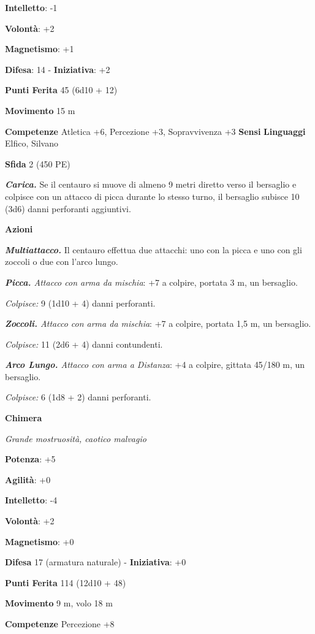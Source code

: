 \begin{multicols}{2}
\textbf{Intelletto}: -1

\textbf{Volontà}: +2

\textbf{Magnetismo}: +1

\textbf{Difesa}: 14 - \textbf{Iniziativa}: +2

\textbf{Punti Ferita} 45 (6d10 + 12)

\textbf{Movimento} 15 m

\textbf{Competenze} Atletica +6, Percezione +3, Sopravvivenza +3
\textbf{Sensi}  \textbf{Linguaggi} Elfico, Silvano

\textbf{Sfida} 2 (450 PE)

\emph{\textbf{Carica.}} Se il centauro si muove di almeno 9 metri
diretto verso il bersaglio e colpisce con un attacco di picca durante lo
stesso turno, il bersaglio subisce 10 (3d6) danni perforanti aggiuntivi.

\textbf{Azioni}

\emph{\textbf{Multiattacco.}} Il centauro effettua due attacchi: uno con
la picca e uno con gli zoccoli o due con l'arco lungo.

\emph{\textbf{Picca.} Attacco con arma da mischia}: +7 a colpire,
portata 3 m, un bersaglio.

\emph{Colpisce:} 9 (1d10 + 4) danni perforanti.

\emph{\textbf{Zoccoli.} Attacco con arma da mischia}: +7 a colpire,
portata 1,5 m, un bersaglio.

\emph{Colpisce:} 11 (2d6 + 4) danni contundenti.

\emph{\textbf{Arco Lungo.} Attacco con arma a Distanza}: +4 a colpire,
gittata 45/180 m, un bersaglio.

\emph{Colpisce:} 6 (1d8 + 2) danni perforanti.



\textbf{Chimera}

\emph{Grande mostruosità, caotico malvagio}

\textbf{Potenza}: +5

\textbf{Agilità}: +0

\textbf{Intelletto}: -4

\textbf{Volontà}: +2

\textbf{Magnetismo}: +0

\textbf{Difesa} 17 (armatura naturale) - \textbf{Iniziativa}: +0

\textbf{Punti Ferita} 114 (12d10 + 48)

\textbf{Movimento} 9 m, volo 18 m

\textbf{Competenze} Percezione +8


\end{multicols}
